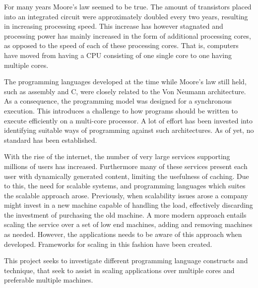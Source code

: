 \makeatletter {}\makeatother
{}
For many years Moore's law\cite{moore1965cramming} seemed to be true. The amount of transistors placed into an integrated circuit were approximately doubled every two years, resulting in increasing processing speed. This increase has however stagnated and processing power has mainly increased in the form of additional processing cores, as opposed to the speed of each of these processing cores. That is, computers have moved from having a \ac{CPU} consisting of one single core to one having multiple cores. 

The programming languages developed at the time while Moore's law still held, such as assembly and C, were closely related to the Von Neumann architecture. As a consequence, the programming model was designed for a synchronous execution. This introduces a challenge to how programs should be written to execute efficiently on a multi-core processor. A lot of effort has been invested into identifying suitable ways of programming against such architectures. As of yet, no standard has been established. 

With the rise of the internet, the number of very large services supporting millions of users has increased. Furthermore many of these services present each user with dynamically generated content, limiting the usefulness of caching. Due to this, the need for scalable systems, and programming languages which suites the scalable approach arose. Previously, when scalability issues arose a company might invest in a new machine capable of handling the load, effectively discarding the investment of purchasing the old machine\cite[p. 2]{haller2007actors}. A more modern approach entails scaling the service over a set of low end machines, adding and removing machines as needed. However, the applications needs to be aware of this approach when developed. Frameworks for scaling in this fashion have been created\cite{haller2007actors}\cite{krohn2004building}.


This project seeks to investigate different programming language constructs and technique, that seek to assist in scaling applications over multiple cores and preferable multiple machines.



 
\worksheetend
